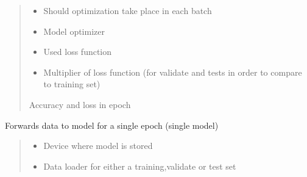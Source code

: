 \documentclass[letterpaper,10pt,english]{sphinxmanual}
\begin{document}
\begin{fulllineitems}
\begin{fulllineitems}
\begin{quote}
\begin{description}
\begin{itemize}
\item {} 
\sphinxAtStartPar
{} \textendash{} Should optimization take place in each batch

\item {} 
\sphinxAtStartPar
{} \textendash{} Model optimizer

\item {} 
\sphinxAtStartPar
{} \textendash{} Used loss function

\item {} 
\sphinxAtStartPar
{} \textendash{} Multiplier of loss function (for validate and tests in order to compare to training set)

\end{itemize}

\sphinxAtStartPar
Accuracy and loss in epoch

\end{description}\end{quote}

\end{fulllineitems}


\begin{fulllineitems}
\label{\detokenize{net:net.UVANEMO.__single_forward}}
\pysigstartsignatures
{}
\pysigstopsignatures
\sphinxAtStartPar
Forwards data to model for a single epoch (single model)
\begin{quote}\begin{description}
\begin{itemize}
\item {} 
\sphinxAtStartPar
{} \textendash{} Device where model is stored

\item {} 
\sphinxAtStartPar
{} \textendash{} Data loader for either a training,validate or test set


\end{itemize}
\end{description}
\end{quote}
\end{fulllineitems}
\end{fulllineitems}
\end{document}
